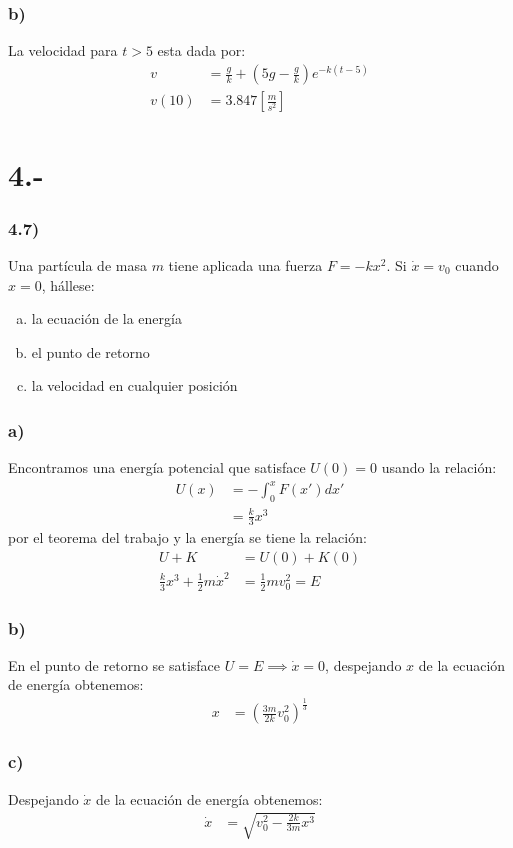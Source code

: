 \documentclass{article}
\begin{document}
\begin{tcolorbox}[breakable]
    \subsubsection*{b)}
    La velocidad para $t>5$ esta dada por:
    \begin{align*}
        v 
        &= \frac{g}{k} + \left( 5g - \frac{g}{k} \right)e^{-k(t-5)}  \\ 
        v(10)
        &= 3.847 \left[ \frac{m}{s^2} \right]
    \end{align*}
\end{tcolorbox}

\section*{4.-}
\subsubsection*{4.7)}
Una partícula de masa $m$ tiene aplicada una fuerza $F=-kx^2$. Si $\dot{x} = v_0$ 
cuando $x=0$, hállese:
\begin{enumerate}[a)]
    \item la ecuación de la energía
    \item el punto de retorno
    \item la velocidad en cualquier posición
\end{enumerate} 
\begin{tcolorbox}[breakable]
    \subsubsection*{a)}
    Encontramos una energía potencial que satisface $U(0) = 0$ usando la relación:
    \begin{align*}
        U(x)
        &= -\int_0^x F(x')dx' \\
        &= \frac{k}{3}x^3  
    \end{align*}
    por el teorema del trabajo y la energía se tiene la relación:
    \begin{align*}
        U + K &= U(0) + K(0) \\
        \frac{k}{3}x^3 + \frac{1}{2}m\dot{x}^2 &= \frac{1}{2}mv_0^2 = E
    \end{align*}
    \subsubsection*{b)}
    En el punto de retorno se satisface $U = E \implies \dot{x} = 0$, 
    despejando $x$ de la ecuación de energía obtenemos:
    \begin{align*}
        x &= \left(\frac{3m}{2k}v_0^2\right)^{\frac{1}{3}}
    \end{align*} 
    \subsubsection*{c)}
    Despejando $\dot{x}$ de la ecuación de energía obtenemos:
    \begin{align*}
        \dot{x} &= \sqrt{v_0^2 - \frac{2k}{3m}x^3}
    \end{align*} 
\end{tcolorbox}
\end{document}
